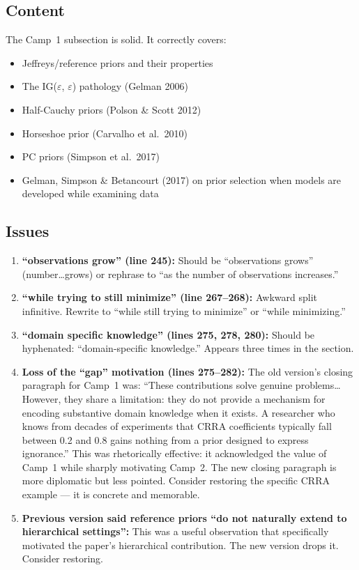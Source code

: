 \documentclass[12pt,a4paper]{article}
\begin{document}
\subsection{Content}

The Camp~1 subsection is solid. It correctly covers:
\begin{itemize}[leftmargin=1.5em]
  \item Jeffreys/reference priors and their properties
  \item The IG($\varepsilon$, $\varepsilon$) pathology (Gelman 2006)
  \item Half-Cauchy priors (Polson \& Scott 2012)
  \item Horseshoe prior (Carvalho et al.\ 2010)
  \item PC priors (Simpson et al.\ 2017)
  \item Gelman, Simpson \& Betancourt (2017) on prior selection when models
    are developed while examining data
\end{itemize}

\subsection{Issues}

\begin{enumerate}[leftmargin=1.5em]
  \item \textbf{``observations grow'' (line 245):} Should be ``observations
    grows'' (number\ldots grows) or rephrase to ``as the number of observations
    increases.''

  \item \textbf{``while trying to still minimize'' (line 267--268):} Awkward
    split infinitive. Rewrite to ``while still trying to minimize'' or
    ``while minimizing.''

  \item \textbf{``domain specific knowledge'' (lines 275, 278, 280):}
    Should be hyphenated: ``domain-specific knowledge.'' Appears three times
    in the section.

  \item \textbf{Loss of the ``gap'' motivation (lines 275--282):} The old
    version's closing paragraph for Camp~1 was: ``These contributions solve
    genuine problems\ldots However, they share a limitation: they do not
    provide a mechanism for encoding substantive domain knowledge when it
    exists. A researcher who knows from decades of experiments that CRRA
    coefficients typically fall between 0.2 and 0.8 gains nothing from a
    prior designed to express ignorance.'' This was rhetorically effective: it
    acknowledged the value of Camp~1 while sharply motivating Camp~2. The new
    closing paragraph is more diplomatic but less pointed. Consider restoring
    the specific CRRA example --- it is concrete and memorable.

  \item \textbf{Previous version said reference priors ``do not naturally
    extend to hierarchical settings'':} This was a useful observation that
    specifically motivated the paper's hierarchical contribution. The new
    version drops it. Consider restoring.
\end{enumerate}
\end{document}
